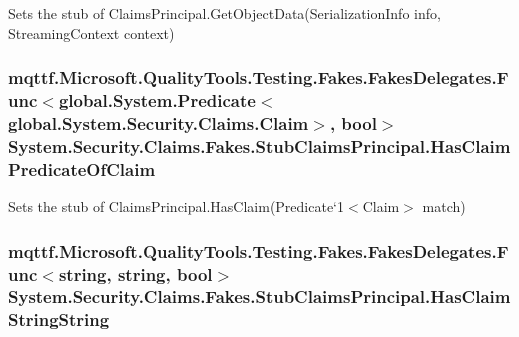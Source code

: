 Sets the stub of Claims\-Principal.\-Get\-Object\-Data(\-Serialization\-Info info, Streaming\-Context context)

\hypertarget{class_system_1_1_security_1_1_claims_1_1_fakes_1_1_stub_claims_principal_ac4ac77b1f05282f215f37dfe2fdc1d08}{
\subsubsection[{Has\-Claim\-Predicate\-Of\-Claim}]{\setlength{\rightskip}{0pt plus 5cm}mqttf.\-Microsoft.\-Quality\-Tools.\-Testing.\-Fakes.\-Fakes\-Delegates.\-Func$<$global.\-System.\-Predicate$<$global.\-System.\-Security.\-Claims.\-Claim$>$, bool$>$ System.\-Security.\-Claims.\-Fakes.\-Stub\-Claims\-Principal.\-Has\-Claim\-Predicate\-Of\-Claim}}\label{class_system_1_1_security_1_1_claims_1_1_fakes_1_1_stub_claims_principal_ac4ac77b1f05282f215f37dfe2fdc1d08}


Sets the stub of Claims\-Principal.\-Has\-Claim(Predicate`1$<$Claim$>$ match)

\hypertarget{class_system_1_1_security_1_1_claims_1_1_fakes_1_1_stub_claims_principal_a8f0c913f0e7e48962d0e7b29253547a0}{
\subsubsection[{Has\-Claim\-String\-String}]{\setlength{\rightskip}{0pt plus 5cm}mqttf.\-Microsoft.\-Quality\-Tools.\-Testing.\-Fakes.\-Fakes\-Delegates.\-Func$<$string, string, bool$>$ System.\-Security.\-Claims.\-Fakes.\-Stub\-Claims\-Principal.\-Has\-Claim\-String\-String}}\label{class_system_1_1_security_1_1_claims_1_1_fakes_1_1_stub_claims_principal_a8f0c913f0e7e48962d0e7b29253547a0}



